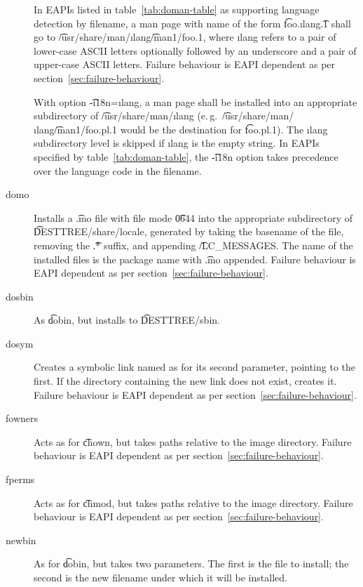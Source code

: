 \begin{description}
     In EAPIs listed in table~\ref{tab:doman-table} as supporting
    language detection by filename, a man page with name of the form \t{foo.}\i{lang}\t{.1} shall
    go to \t{/usr/share/man/}\i{lang}\t{/man1/foo.1}, where \i{lang} refers to a pair of lower-case
    ASCII letters optionally followed by an underscore and a pair of upper-case ASCII letters.
    Failure behaviour is EAPI dependent as per section~\ref{sec:failure-behaviour}.

    With option \t{-i18n=}\i{lang}, a man page shall be installed into an appropriate subdirectory
    of \t{/usr/share/man/}\i{lang} (e.\,g.\ \t{/usr/share/man/}\i{lang}\t{/man1/foo.pl.1} would be
    the destination for \t{foo.pl.1}). The \i{lang} subdirectory level is skipped if \i{lang} is
    the empty string. In EAPIs specified by table~\ref{tab:doman-table}, the \t{-i18n} option takes
    precedence over the language code in the filename.

\item[domo] Installs a \t{.mo} file with file mode \t{0644} into the appropriate subdirectory of
    \t{DESTTREE/share/locale}, generated by taking the basename of the file, removing the \t{.*}
    suffix, and appending \t{/LC\_MESSAGES}. The name of the installed files is the package name
    with \t{.mo} appended. Failure behaviour is EAPI dependent as per section~\ref{sec:failure-behaviour}.

\item[dosbin] As \t{dobin}, but installs to \t{DESTTREE/sbin}.

\item[dosym] Creates a symbolic link named as for its second parameter, pointing to the first. If
    the directory containing the new link does not exist, creates it. Failure behaviour is EAPI
    dependent as per section~\ref{sec:failure-behaviour}.

\item[fowners] Acts as for \t{chown}, but takes paths relative to the image directory. Failure
    behaviour is EAPI dependent as per section~\ref{sec:failure-behaviour}.

\item[fperms] Acts as for \t{chmod}, but takes paths relative to the image directory. Failure
    behaviour is EAPI dependent as per section~\ref{sec:failure-behaviour}.

\item[newbin] As for \t{dobin}, but takes two parameters. The first is the file to install; the
    second is the new filename under which it will be installed.


\end{description}

